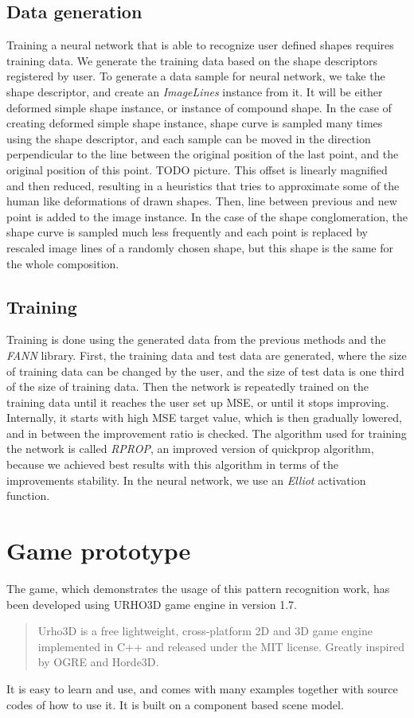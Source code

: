 \subsection{Data generation}
Training a neural network that is able to recognize user defined shapes requires training data. We generate the training data based on the shape descriptors registered by user. To generate a data sample for neural network, we take the shape descriptor, and create an \emph{ImageLines} instance from it. It will be either deformed simple shape instance, or instance of compound shape. In the case of creating deformed simple shape instance, shape curve is sampled many times using the shape descriptor, and each sample can be moved in the direction perpendicular to the line between the original position of the last point, and the original position of this point. TODO picture. This offset is linearly magnified and then reduced, resulting in a heuristics that tries to approximate some of the human like deformations of drawn shapes. Then, line between previous and new point is added to the image instance. In the case of the shape conglomeration, the shape curve is sampled much less frequently and each point is replaced by rescaled image lines of a randomly chosen shape, but this shape is the same for the whole composition.

\subsection{Training}
Training is done using the generated data from the previous methods and the \emph{FANN} library. First, the training data and test data are generated, where the size of training data can be changed by the user, and the size of test data is one third of the size of training data. Then the network is repeatedly trained on the training data until it reaches the user set up MSE, or until it stops improving. Internally, it starts with high MSE target value, which is then gradually lowered, and in between the improvement ratio is checked. The algorithm used for training the network is called \emph{RPROP}, an improved version of quickprop algorithm, because we achieved best results with this algorithm in terms of the improvements stability. In the neural network, we use an \emph{Elliot} activation function.

\section{Game prototype}
The game, which demonstrates the usage of this pattern recognition work, has been developed using URHO3D game engine in version 1.7. \begin{quotation} Urho3D is a free lightweight, cross-platform 2D and 3D game engine implemented in C++ and released under the MIT license. Greatly inspired by OGRE and Horde3D. \end{quotation} It is easy to learn and use, and comes with many examples together with source codes of how to use it. It is built on a component based scene model. 

